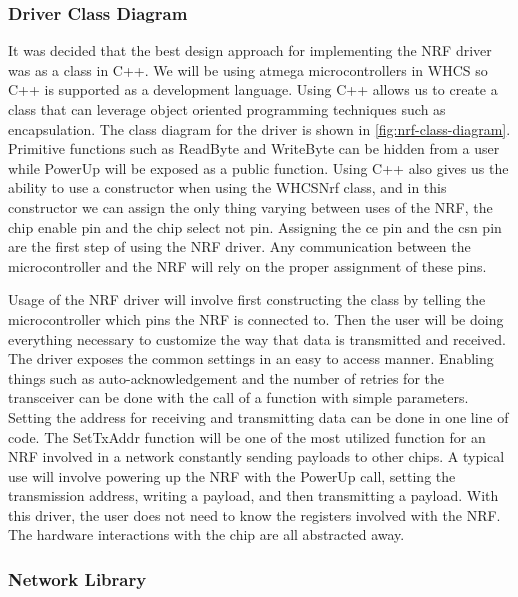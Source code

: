 \subsubsection{Driver Class Diagram}
It was decided that the best design approach for implementing the NRF driver
was as a class in C++. We will be using atmega microcontrollers in WHCS so C++
is supported as a development language. Using C++ allows us to create a class
that can leverage object oriented programming techniques such as encapsulation.
The class diagram for the driver is shown in \autoref{fig:nrf-class-diagram}.
Primitive functions such as ReadByte and WriteByte can be hidden from a user
while PowerUp will be exposed as a public function. Using C++ also gives us the
ability to use a constructor when using the WHCSNrf class, and in this
constructor we can assign the only thing varying between uses of the NRF, the
chip enable pin and the chip select not pin. Assigning the ce pin and the csn
pin are the first step of using the NRF driver. Any communication between the
microcontroller and the NRF will rely on the proper assignment of these pins.


Usage of the NRF driver will involve first constructing the class by telling
the microcontroller which pins the NRF is connected to. Then the user will be
doing everything necessary to customize the way that data is transmitted and
received. The driver exposes the common settings in an easy to access manner.
Enabling things such as auto{}-acknowledgement and the number of retries for
the transceiver can be done with the call of a function with simple parameters.
Setting the address for receiving and transmitting data can be done in one line
of code. The SetTxAddr function will be one of the most utilized function for
an NRF involved in a network constantly sending payloads to other chips. A
typical use will involve powering up the NRF with the PowerUp call, setting the
transmission address, writing a payload, and then transmitting a payload. With
this driver, the user does not need to know the registers involved with the
NRF. The hardware interactions with the chip are all abstracted away.

\subsubsection{Network Library}
\label{sec:network-library}

